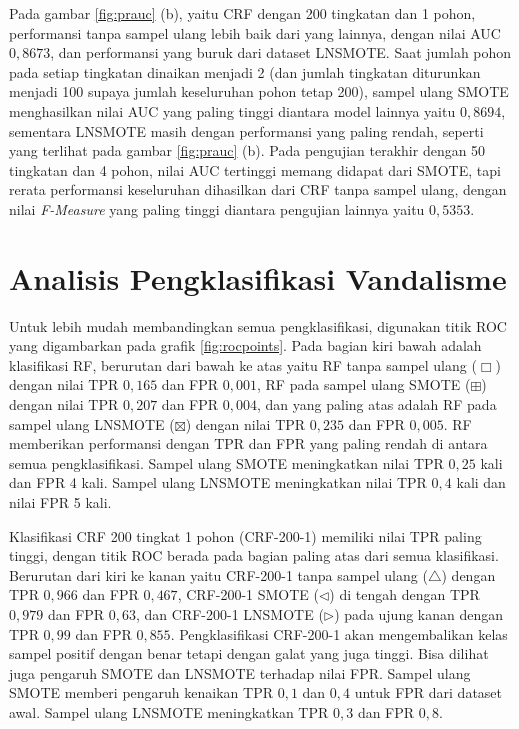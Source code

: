 Pada gambar \ref{fig:prauc} (b), yaitu CRF dengan 200 tingkatan dan 1 pohon,
performansi tanpa sampel ulang lebih baik dari yang lainnya, dengan nilai AUC
$0,8673$, dan performansi yang buruk dari dataset LNSMOTE.
Saat jumlah pohon pada setiap tingkatan dinaikan menjadi 2 (dan jumlah
tingkatan diturunkan menjadi 100 supaya jumlah keseluruhan pohon tetap 200),
sampel ulang SMOTE menghasilkan nilai AUC yang paling tinggi diantara
model lainnya yaitu $0,8694$, sementara LNSMOTE masih dengan performansi yang
paling rendah, seperti yang terlihat pada gambar \ref{fig:prauc} (b).
Pada pengujian terakhir dengan 50 tingkatan dan 4 pohon, nilai AUC tertinggi
memang didapat dari SMOTE, tapi rerata performansi keseluruhan dihasilkan dari
CRF tanpa sampel ulang, dengan nilai \textit{F-Measure} yang paling tinggi
diantara pengujian lainnya yaitu $0,5353$.



\section{Analisis Pengklasifikasi Vandalisme}



Untuk lebih mudah membandingkan semua pengklasifikasi, digunakan titik
ROC yang digambarkan pada grafik \ref{fig:rocpoints}.
Pada bagian kiri bawah adalah klasifikasi RF, berurutan dari bawah ke atas
yaitu RF tanpa sampel ulang ($\Box$) dengan nilai TPR $0,165$ dan FPR $0,001$,
RF pada sampel ulang SMOTE ($\boxplus$) dengan nilai TPR $0,207$ dan FPR
$0,004$, dan yang
paling atas adalah RF pada sampel ulang LNSMOTE ($\boxtimes$) dengan nilai TPR
$0,235$ dan FPR $0,005$.
RF memberikan performansi dengan TPR dan FPR yang paling rendah di antara semua
pengklasifikasi.
Sampel ulang SMOTE meningkatkan nilai TPR $0,25$ kali dan FPR 4 kali.
Sampel ulang LNSMOTE meningkatkan nilai TPR $0,4$ kali dan nilai FPR 5 kali.

Klasifikasi CRF 200 tingkat 1 pohon (CRF-200-1) memiliki nilai TPR paling
tinggi, dengan titik ROC berada pada bagian paling atas dari semua klasifikasi.
Berurutan dari kiri ke kanan yaitu CRF-200-1 tanpa sampel ulang ($\triangle$)
dengan TPR $0,966$ dan FPR $0,467$, CRF-200-1 SMOTE ($\triangleleft$) di tengah
dengan TPR $0,979$ dan FPR $0,63$, dan CRF-200-1 LNSMOTE ($\triangleright$)
pada ujung kanan dengan TPR $0,99$ dan FPR $0,855$.
Pengklasifikasi CRF-200-1 akan mengembalikan kelas sampel positif dengan benar
tetapi dengan galat yang juga tinggi.
Bisa dilihat juga pengaruh SMOTE dan LNSMOTE terhadap nilai FPR.
Sampel ulang SMOTE memberi pengaruh kenaikan TPR $0,1$ dan $0,4$ untuk FPR dari
dataset awal.
Sampel ulang LNSMOTE meningkatkan TPR $0,3$ dan FPR $0,8$.

